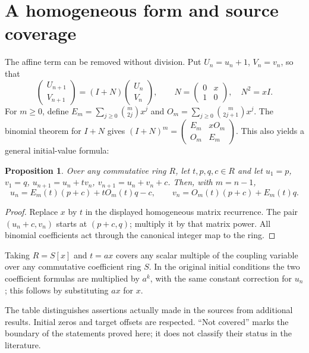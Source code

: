 \documentclass[11pt]{article}
\newtheorem{proposition}[theorem]{Proposition}
\begin{document}
\section{A homogeneous form and source coverage}
The affine term can be removed without division. Put $U_n=u_n+1$,
$V_n=v_n$, so that
\[
\begin{pmatrix}U_{n+1}\\V_{n+1}\end{pmatrix}
=\left(I+N\right)\begin{pmatrix}U_n\\V_n\end{pmatrix},\qquad
N=\begin{pmatrix}0&x\\1&0\end{pmatrix},\quad N^2=xI.
\]
For $m\geq0$, define
$E_m=\sum_{j\geq0}\binom m{2j}x^j$ and
$O_m=\sum_{j\geq0}\binom m{2j+1}x^j$.
The binomial theorem for $I+N$ gives
$(I+N)^m=\left(\begin{smallmatrix}E_m&xO_m\\O_m&E_m\end{smallmatrix}\right)$.
This also yields a general initial-value formula:

\begin{proposition}\label{prop:general}
Over any commutative ring $R$, let $t,p,q,c\in R$ and let
$u_1=p$, $v_1=q$, $u_{n+1}=u_n+tv_n$,
$v_{n+1}=u_n+v_n+c$. Then, with $m=n-1$,
\[
u_n=E_m(t)(p+c)+tO_m(t)q-c,\qquad
v_n=O_m(t)(p+c)+E_m(t)q.
\]
\end{proposition}
\begin{proof}
Replace $x$ by $t$ in the displayed homogeneous matrix recurrence.
The pair $(u_n+c,v_n)$ starts at $(p+c,q)$; multiply it by that matrix power.
All binomial coefficients act through the canonical integer map to the ring.
\end{proof}
Taking $R=S[x]$ and $t=ax$ covers any scalar multiple of the coupling
variable over any commutative coefficient ring $S$. In the original initial
conditions the two coefficient formulas are multiplied by $a^k$, with the
same constant correction for $u_n$; this follows by substituting $ax$ for $x$.

\noindent The table distinguishes assertions actually made in the sources
from additional results. Initial zeros and target offsets are respected.
``Not covered'' marks the boundary of the statements proved here; it does
not classify their status in the literature.
\end{document}
